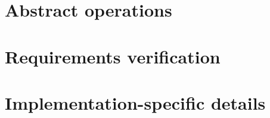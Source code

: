 \section{Abstract operations} %
\label{sec:AbstractOp}

\section{Requirements verification} %
\label{sec:RequirementVerif}

\section{Implementation-specific details}
\label{sec:ImplSpecDetails}
